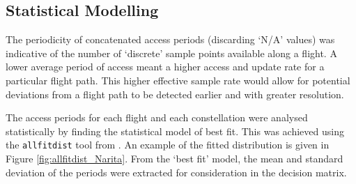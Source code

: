 \subsection{Statistical Modelling} \label{sec:prob_distro}
The periodicity of concatenated access periods (discarding `N/A' values) was indicative of the number of `discrete' sample points available along a flight. A lower average period of access meant a higher access and update rate for a particular flight path. This higher effective sample rate would allow for potential deviations from a flight path to be detected earlier and with greater resolution.

The access periods for each flight and each constellation were analysed statistically by finding the statistical  model of best fit. This was achieved using the \verb|allfitdist| tool from \cite{sheppard12}. An example of the fitted distribution is given in Figure \ref{fig:allfitdist_Narita}. From the `best fit' model, the mean and standard deviation of the periods were extracted for consideration in the decision matrix.
